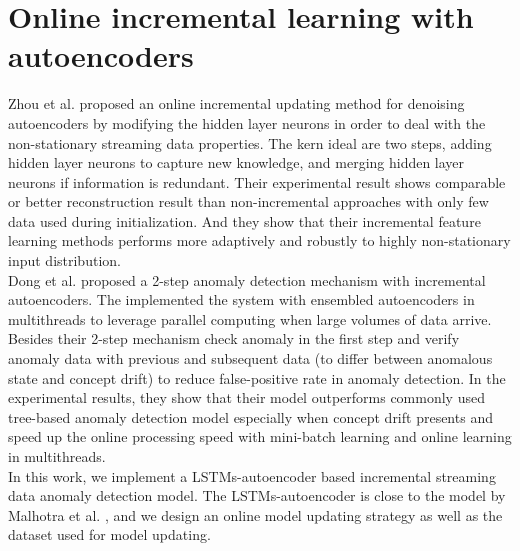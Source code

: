 \section{Online incremental learning with autoencoders}
\label{sec:Online incremental learning with autoencoders}

Zhou et al. \cite{online} proposed an online incremental updating method for denoising autoencoders by modifying the hidden layer neurons in order to deal with the non-stationary streaming data properties. The kern ideal are two steps, adding hidden layer neurons to capture new knowledge, and merging hidden layer neurons if information is redundant. Their experimental result shows comparable or better reconstruction result than non-incremental approaches with only few data used during initialization. And they show that their incremental feature learning methods performs more adaptively and robustly to highly non-stationary input distribution.\\

Dong et al. \cite{threaded} proposed a 2-step anomaly detection mechanism with incremental autoencoders. The implemented the system with ensembled autoencoders in multithreads to leverage parallel computing when large volumes of data arrive. Besides their 2-step mechanism check anomaly in the first step and verify anomaly data with previous and subsequent data (to differ between anomalous state and concept drift) to reduce false-positive rate in anomaly detection. In the experimental results, they show that their model outperforms commonly used tree-based anomaly detection model especially when concept drift presents and speed up the online processing speed with mini-batch learning and online learning in multithreads.\\

In this work, we implement a LSTMs-autoencoder based incremental streaming data anomaly detection model. The LSTMs-autoencoder is close to the model by Malhotra et al. \cite{encdecad}, and we design an online model updating strategy as well as the dataset used for model updating.







